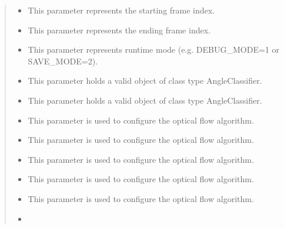 \documentclass[letterpaper,10pt,english,openany,oneside]{sphinxmanual}
\begin{document}
\begin{fulllineitems}
\begin{fulllineitems}
\begin{quote}
\begin{description}
\begin{itemize}
\item {} 
 \textendash{} This parameter represents the starting frame index.

\item {} 
 \textendash{} This parameter represents the ending frame index.

\item {} 
 \textendash{} This parameter represents runtime mode (e.g. DEBUG\_MODE=1 or SAVE\_MODE=2).

\item {} 
 \textendash{} This parameter holds a valid object of class type AngleClassifier.

\item {} 
 \textendash{} This parameter holds a valid object of class type AngleClassifier.

\item {} 
 \textendash{} This parameter is used to configure the optical flow algorithm.

\item {} 
 \textendash{} This parameter is used to configure the optical flow algorithm.

\item {} 
 \textendash{} This parameter is used to configure the optical flow algorithm.

\item {} 
 \textendash{} This parameter is used to configure the optical flow algorithm.

\item {} 
 \textendash{} This parameter is used to configure the optical flow algorithm.

\item {} 
 \textendash{} 

\end{itemize}

\end{description}\end{quote}


\end{fulllineitems}
\end{fulllineitems}
\end{document}
